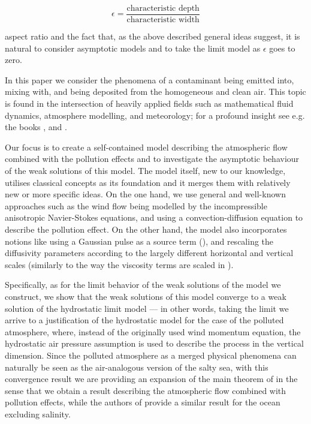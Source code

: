 \documentclass[11pt]{article}
\begin{document}
\[ \epsilon = \frac{\text{characteristic depth}}{\text{characteristic width}} \]

aspect ratio and the fact that, as the above described general ideas suggest, it is natural to consider asymptotic models and to take the limit model as $\epsilon$ goes to zero.

In this paper we consider the phenomena of a contaminant being emitted into, mixing with, and being deposited from the homogeneous and clean air. This topic is found in the intersection of heavily applied fields such as mathematical fluid dynamics, atmosphere modelling, and meteorology; for a profound insight see e.g. the books \cite{arya2001introduction}, \cite{pedlosky2013geophysical} and \cite{temam2001navier}.

Our focus is to create a self-contained model describing the atmospheric flow combined with the pollution effects and to investigate the asymptotic behaviour of the weak solutions of this model. The model itself, new to our knowledge, utilises classical concepts as its foundation and it merges them with relatively new or more specific ideas. On the one hand, we use general and well-known approaches such as the wind flow being modelled by the incompressible anisotropic Navier-Stokes equations, and using a convection-diffusion equation to describe the pollution effect. On the other hand, the model also incorporates notions like using a Gaussian pulse as a source term (\cite{zhuk2016source}), and rescaling the diffusivity parameters according to the largely different horizontal and vertical scales (similarly to the way the viscosity terms are scaled in \cite{azerad2001mathematical}).

Specifically, as for the limit behavior of the weak solutions of the model we construct, we show that the weak solutions of this model converge to a weak solution of the hydrostatic limit model --- in other words, taking the limit we arrive to a justification of the hydrostatic model for the case of the polluted atmosphere, where, instead of the originally used wind momentum equation, the hydrostatic air pressure assumption is used to describe the process in the vertical dimension. Since the polluted atmosphere as a merged physical phenomena can naturally be seen as the air-analogous version of the salty sea, with this convergence result we are providing an expansion of the main theorem of \cite{azerad2001mathematical} in the sense that we obtain a result describing the atmospheric flow combined with pollution effects, while the authors of \cite{azerad2001mathematical} provide a similar result for the ocean excluding salinity.
\end{document}
